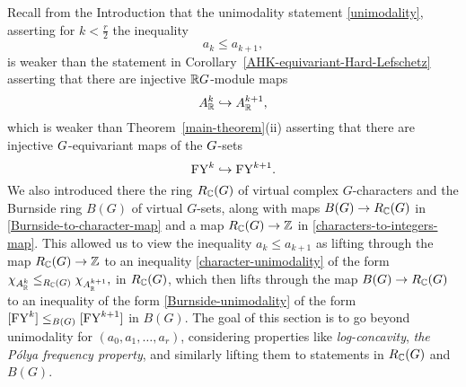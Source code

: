 \label{rep-theoreric-inequalities-section}


Recall from the Introduction that the unimodality statement \eqref{unimodality}, asserting
for $k < \frac{r}{2}$ the inequality
$$
a_k \leq a_{k+1},
$$
is weaker than the statement in Corollary~\ref{AHK-equivariant-Hard-Lefschetz} asserting that there are injective $\mathbb{R} G$-module maps
$$
A^k_{\mathbb{R}} \hookrightarrow A_{\mathbb{R}}^{k+1},
$$
which is weaker than 
Theorem~\ref{main-theorem}(ii) asserting that there are
injective $G$-equivariant maps of the $G$-sets
$$
\mathrm{FY}^k \hookrightarrow \mathrm{FY}^{k+1}.
$$
We also introduced there the ring $R_{\mathbb{C}}(G)$ of virtual complex $G$-characters and the Burnside ring $B(G)$ of virtual $G$-sets,
along with maps $B(G) \rightarrow R_{\mathbb{C}}(G)$ in
\eqref{Burnside-to-character-map} and a map 
$R_{\mathbb{C}}(G) \rightarrow \mathbb{Z}$ in \eqref{characters-to-integers-map}. This allowed us to view the inequality $a_k \leq a_{k+1}$ as lifting through the map $R_{\mathbb{C}}(G) \rightarrow \mathbb{Z}$ to an inequality \eqref{character-unimodality} of the form $
\chi_{A^k_{\mathbb{R}}} \leq_{R_{\mathbb{C}}(G)} \chi_{A_{\mathbb{R}}^{k+1}},
$
in $R_{\mathbb{C}}(G)$, which then lifts 
through the map $B(G) \rightarrow R_{\mathbb{C}}(G)$ to an inequality
of the form \eqref{Burnside-unimodality} 
of the form $[\mathrm{FY}^k] \leq_{B(G)} [\mathrm{FY}^{k+1}]$ in $B(G)$.  The goal of this section is to go beyond unimodality for $(a_0,a_1,\ldots,a_r)$, 
considering properties
like {\it log-concavity}, {\it the P\'olya frequency property}, and similarly lifting them to statements in $R_{\mathbb{C}}(G)$ and $B(G)$.


